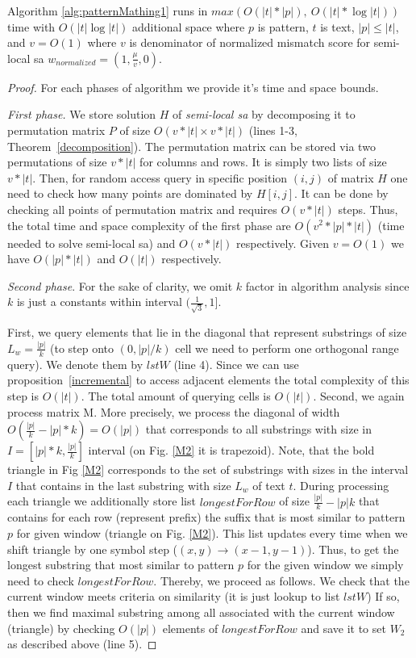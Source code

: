 \begin{theorem}
Algorithm \ref{alg:patternMathing1} runs in $max(O(|t|*|p|),\ O(|t| * \log |t|))$ time with $O( |t| \log |t|)$ additional space where $p$ is pattern, $t$ is text, $|p| \leq |t|$, and $v=O(1)$ where $v$ is denominator of normalized mismatch score for semi-local sa $w_{normalized} = (1,\frac{\mu}{v},0)$.
\end{theorem}
\begin{proof}
  For each phases of algorithm we provide it's time and space bounds.
  
\emph{First phase.}
We store solution $H$ of \emph{semi-local sa} by decomposing it to permutation matrix $P$ of size $O(v*|t| \times v*|t|)$ (lines 1-3, Theorem~\ref{decomposition}).
The permutation matrix can be stored via two permutations of size $v*|t|$ for columns and rows.
It is simply two lists of size $v*|t|$.
Then, for random access query in specific position $(i,j)$ of matrix $H$ one need to check how many points are dominated by $H [i,j]$.
It can be done by checking all points of permutation matrix and requires $O(v * |t|)$ steps.
Thus, the total time and space complexity of the first phase are $O(v^2 *|p| * |t|)$ (time needed to solve semi-local sa) and $O(v*|t|)$ respectively.
Given $v=O(1)$ we have $O(|p| * |t|)$ and $O(|t|)$ respectively.

\emph{Second phase}.
For the sake of clarity, we omit $k$ factor in algorithm analysis since $k$ is just a constants within interval $(\frac{1}{\sqrt{3}},1]$.

First, we query elements that lie in the diagonal that represent
substrings of size $L_{w}=\frac{|p|}{k}$ (to step onto $(0,|p|/k)$ cell we need to perform one orthogonal range query).
We denote them by $lstW$ (line 4).
Since we can use proposition~\ref{incremental} to access
adjacent elements 
the total complexity of this step is $O(|t|)$.
The total amount of querying cells is $O(|t|)$. 
Second, we again process matrix M.
More precisely, we process the diagonal of width $O(\frac{|p|}{k}-|p|*k)=O(|p|)$ that corresponds to all substrings with size in  $I=[|p|*k, \frac{|p|}{k}]$ interval (on Fig. \ref{M2} it is  trapezoid).
Note, that the bold triangle in Fig  \ref{M2} corresponds to the set of substrings with sizes in the interval $I$ that contains in the last substring with size $L_{w}$ of text $t$.
During processing each triangle we  additionally store list $longestForRow$ of size $\frac{|p|}{k}-|p|k$ that contains
for each row (represent prefix) the suffix that is most similar to pattern $p$ for given window (triangle on Fig. \ref{M2}).
This list updates every time when we shift triangle by one symbol step ($(x,y)\rightarrow (x-1,y-1)$).
Thus, to get the longest substring that most similar to pattern $p$ for the given window we simply need to check $longestForRow$. 
Thereby, we proceed as follows.
We check that the current window meets criteria
on similarity (it is just lookup to list $lstW$)
If so, then we find maximal substring among all associated with the current window (triangle) by checking $O(|p|)$ elements of $longestForRow$ and save it to set $W_{2}$ as described above (line 5).


\end{proof}
